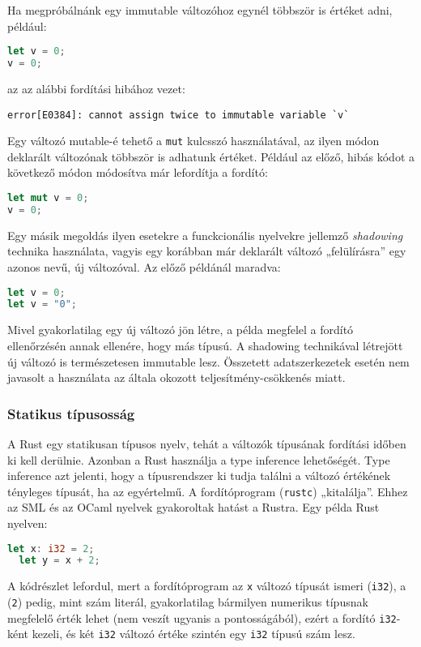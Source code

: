 Ha megpróbálnánk egy immutable változóhoz egynél többször is értéket adni, például:
\begin{lstlisting}[language=Rust, style=boxed]
let v = 0;
v = 0;
\end{lstlisting}
az az alábbi fordítási hibához vezet:
\begin{verbatim}
error[E0384]: cannot assign twice to immutable variable `v`
\end{verbatim}
Egy változó mutable-é tehető a \texttt{mut} kulcsszó használatával, az ilyen módon deklarált változónak többször is adhatunk értéket. Például az előző, hibás kódot a következő módon módosítva már lefordítja a fordító:
\begin{lstlisting}[language=Rust, style=boxed]
let mut v = 0;
v = 0;
\end{lstlisting}
Egy másik megoldás ilyen esetekre a funckcionális nyelvekre %
jellemző \textit{shadowing} technika használata, vagyis egy korábban már deklarált változó „felülírásra” egy azonos nevű, új változóval. Az előző példánál maradva:
\begin{lstlisting}[language=Rust, style=boxed]
let v = 0;
let v = "0";
\end{lstlisting}
Mivel gyakorlatilag egy új változó jön létre, a példa megfelel a fordító ellenőrzésén annak ellenére, hogy más típusú. A shadowing technikával létrejött új változó is természetesen immutable lesz. Összetett adatszerkezetek esetén nem javasolt a használata az általa okozott teljesítmény-csökkenés miatt.

\subsubsection{Statikus típusosság}
A Rust egy statikusan típusos nyelv, tehát a változók típusának fordítási időben ki kell derülnie. Azonban a Rust használja a type inference lehetőségét. Type inference azt jelenti, hogy a típusrendszer ki tudja találni a változó értékének tényleges típusát, ha az egyértelmű. A fordítóprogram (\lstinline{rustc}) „kitalálja”. Ehhez az SML és az OCaml nyelvek gyakoroltak hatást a Rustra. Egy példa Rust nyelven:
\begin{lstlisting}[language=Rust, style=boxed]
  let x: i32 = 2;
  let y = x + 2;
\end{lstlisting}
A kódrészlet lefordul, mert a fordítóprogram az \lstinline{x} változó típusát ismeri (\lstinline{i32}), a (\lstinline{2}) pedig, mint szám literál, gyakorlatilag bármilyen numerikus típusnak megfelelő érték lehet (nem veszít ugyanis a pontosságából), ezért a fordító \lstinline{i32}-ként kezeli, és két \lstinline{i32} változó értéke szintén egy \lstinline{i32} típusú szám lesz.

